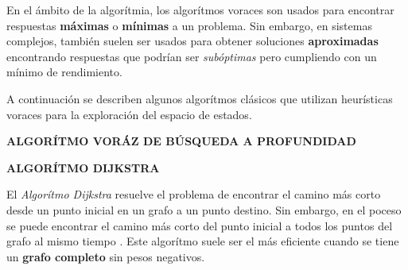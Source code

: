 En el ámbito de la algorítmia, los algorítmos voraces son usados para encontrar respuestas \textbf{máximas} o \textbf{mínimas} a un problema. Sin embargo, en sistemas complejos, también suelen ser usados para obtener soluciones \textbf{aproximadas} encontrando respuestas que podrían ser \textit{subóptimas} pero cumpliendo con un mínimo de rendimiento. 

A continuación se describen algunos algorítmos clásicos que utilizan heurísticas voraces para la exploración del espacio de estados.

\newpage

\textbf{ALGORÍTMO VORÁZ DE BÚSQUEDA A PROFUNDIDAD}


\textbf{ALGORÍTMO DIJKSTRA}

El \textit{Algorítmo Dijkstra} resuelve el problema de encontrar el camino más corto desde un punto inicial en un grafo a un punto destino. Sin embargo, en el poceso se puede encontrar el camino más corto del punto inicial a todos los puntos del grafo al mismo tiempo \parencite{javaid2013understanding}. Este algorítmo suele ser el más eficiente cuando se tiene un \textbf{grafo completo} sin pesos negativos.


